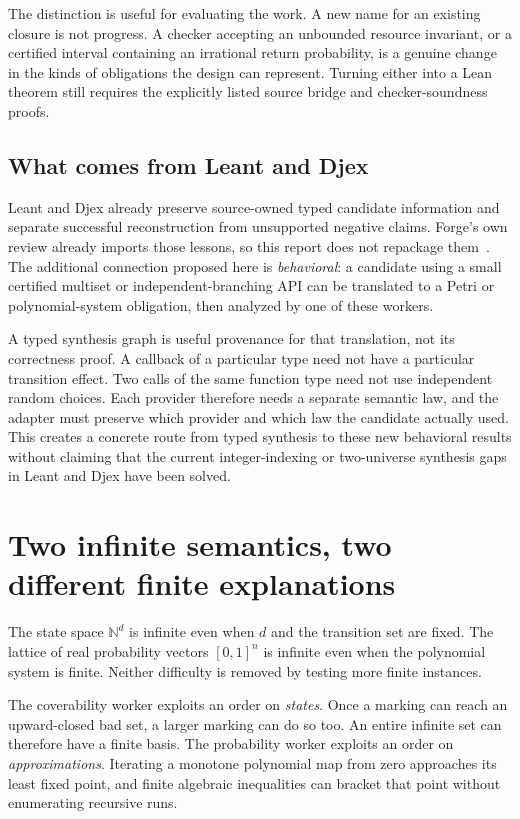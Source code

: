 \documentclass[11pt,a4paper]{article}
\theoremstyle{definition}\newtheorem{definition}[theorem]{Definition}
\theoremstyle{remark}\newtheorem{remark}[theorem]{Remark}
\newcommand{\N}{\mathbb N}\newcommand{\Q}{\mathbb Q}\newcommand{\R}{\mathbb R}
\begin{document}
The distinction is useful for evaluating the work. A new name for an existing closure is not progress. A checker accepting an unbounded resource invariant, or a certified interval containing an irrational return probability, is a genuine change in the kinds of obligations the design can represent. Turning either into a Lean theorem still requires the explicitly listed source bridge and checker-soundness proofs.

\subsection{What comes from Leant and Djex}
Leant and Djex already preserve source-owned typed candidate information and separate successful reconstruction from unsupported negative claims. Forge's own review already imports those lessons, so this report does not repackage them~\cite{forge-neighbors,leant,djex}. The additional connection proposed here is \emph{behavioral}: a candidate using a small certified multiset or independent-branching API can be translated to a Petri or polynomial-system obligation, then analyzed by one of these workers.

A typed synthesis graph is useful provenance for that translation, not its correctness proof. A callback of a particular type need not have a particular transition effect. Two calls of the same function type need not use independent random choices. Each provider therefore needs a separate semantic law, and the adapter must preserve which provider and which law the candidate actually used. This creates a concrete route from typed synthesis to these new behavioral results without claiming that the current integer-indexing or two-universe synthesis gaps in Leant and Djex have been solved.

\section{Two infinite semantics, two different finite explanations}
The state space $\N^d$ is infinite even when $d$ and the transition set are fixed. The lattice of real probability vectors $[0,1]^n$ is infinite even when the polynomial system is finite. Neither difficulty is removed by testing more finite instances.

The coverability worker exploits an order on \emph{states}. Once a marking can reach an upward-closed bad set, a larger marking can do so too. An entire infinite set can therefore have a finite basis. The probability worker exploits an order on \emph{approximations}. Iterating a monotone polynomial map from zero approaches its least fixed point, and finite algebraic inequalities can bracket that point without enumerating recursive runs.
\end{document}
